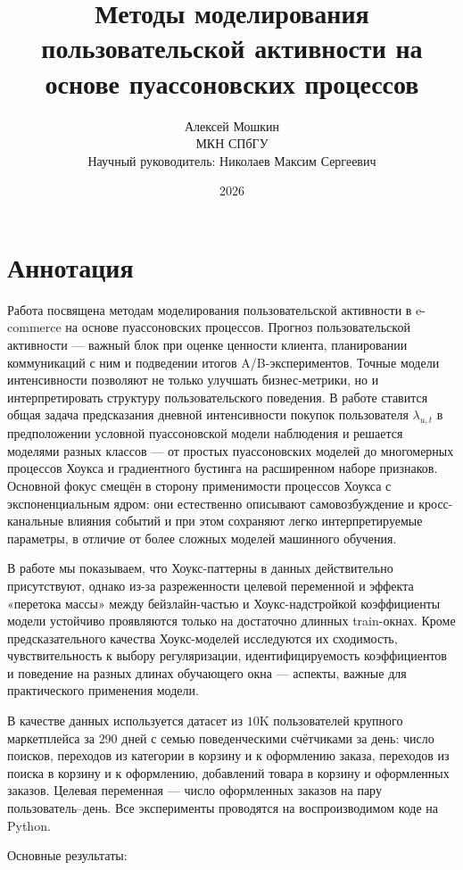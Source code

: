 \documentclass[12pt,a4paper]{article}
\title{Методы моделирования пользовательской активности на основе пуассоновских процессов}
\author{Алексей Мошкин\\\small МКН СПбГУ\\\small Научный руководитель: Николаев Максим Сергеевич}
\date{2026}
\begin{document}
\maketitle

\section*{Аннотация}

Работа посвящена методам моделирования пользовательской активности в e-commerce на основе пуассоновских процессов. Прогноз пользовательской активности --- важный блок при оценке ценности клиента, планировании коммуникаций с ним и подведении итогов A/B-экспериментов. Точные модели интенсивности позволяют не только улучшать бизнес-метрики, но и интерпретировать структуру пользовательского поведения. В работе ставится общая задача предсказания дневной интенсивности покупок пользователя $\lambda _{u,t}$ в предположении условной пуассоновской модели наблюдения и решается моделями разных классов --- от простых пуассоновских моделей до многомерных процессов Хоукса и градиентного бустинга на расширенном наборе признаков. Основной фокус смещён в сторону применимости процессов Хоукса с экспоненциальным ядром: они естественно описывают самовозбуждение и кросс-канальные влияния событий и при этом сохраняют легко интерпретируемые параметры, в отличие от более сложных моделей машинного обучения.

В работе мы показываем, что Хоукс-паттерны в данных действительно присутствуют, однако из-за разреженности целевой переменной и эффекта «перетока массы» между бейзлайн-частью и Хоукс-надстройкой коэффициенты модели устойчиво проявляются только на достаточно длинных train-окнах. Кроме предсказательного качества Хоукс-моделей исследуются их сходимость, чувствительность к выбору регуляризации, идентифицируемость коэффициентов и поведение на разных длинах обучающего окна --- аспекты, важные для практического применения модели.

В качестве данных используется датасет из $10\text{K}$ пользователей крупного маркетплейса за $290$ дней с семью поведенческими счётчиками за день: число поисков, переходов из категории в корзину и к оформлению заказа, переходов из поиска в корзину и к оформлению, добавлений товара в корзину и оформленных заказов. Целевая переменная --- число оформленных заказов на пару пользователь--день. Все эксперименты проводятся на воспроизводимом коде на Python.

Основные результаты:
\end{document}
